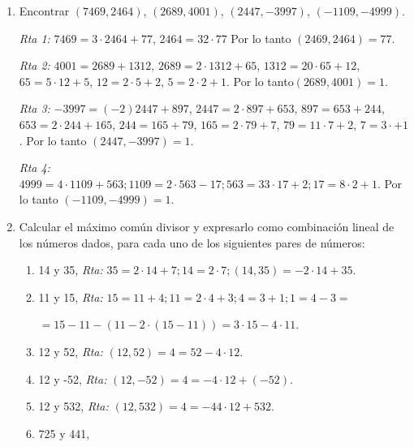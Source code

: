 \documentclass[a4paper,12pt,twoside,spanish,reqno]{amsbook}
\numberwithin{equation}{section}
\newcommand{\rta}{\noindent\textit{Rta: }}
\begin{document}
\begin{enumerate}
\item Encontrar $(7469,2464)$, $(2689,4001)$, $(2447,-3997)$, $(-1109,-4999)$.

\noindent\textit{Rta 1: }  $7469=3\cdot 2464+ 77$, $2464= 32\cdot77$ Por lo tanto $(2469,2464)=77$.

\noindent\textit{Rta 2: }  $4001=2689+ 1312$, $2689=2\cdot 1312+65$,  $1312=20\cdot 65+12$,  $65=5\cdot 12+5$,  $12=2\cdot 5+2$, $ 5=2\cdot 2+1$. Por lo tanto$ (2689, 4001)=1$.

\noindent\textit{Rta 3: } $-3997=(-2)2447+897$,  $2447=2\cdot 897+653$,  $897=653+244$,  $653=2\cdot244+165$, $244=165+79$,  $165=2\cdot79+7$, $79=11\cdot7+2$, $7=3\cdot+1$. Por lo tanto $(2447,-3997)=1$.

\noindent\textit{Rta 4: } $4999=4\cdot1109+ 563; 1109=2\cdot 563-17; 563=33\cdot 17+2; 17=8\cdot 2+1$. Por lo tanto $(-1109,-4999)=1$.


\item
Calcular el máximo común divisor y expresarlo como combinaci\'on lineal de los
números dados, para cada uno de  los siguientes pares de números:
\begin{enumerate}
    \item     14 y 35, \rta $35=2\cdot14+7; 14=2\cdot7; (14, 35)=-2\cdot 14+35$.
    \item 11 y 15, \rta  $15=11+4; 11=2\cdot4+3; 4=3+1; 1= 4-3=$\par\quad\quad\quad\quad\quad$=15-11- (11-2\cdot(15-11))=3\cdot 15-4\cdot11$.
    \item 12 y 52, \rta  $(12, 52)=4=52-4\cdot12$.
    \item  12 y -52, \rta  $(12, -52)=4=-4\cdot 12+(-52)$.
    \item 12 y 532,  \rta  $ (12,532)=4=-44\cdot 12+532$.
    \item  725 y 441,
    

\end{enumerate}
\end{enumerate}
\end{document}
